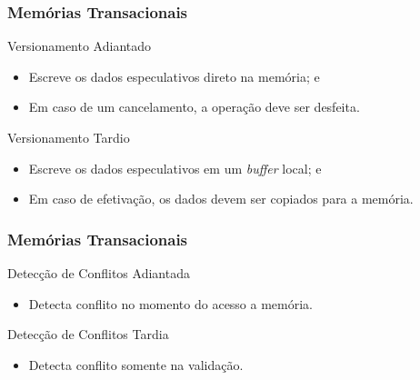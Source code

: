 \documentclass[10pt, pdf,xcolor=pdftex,dvipsnames,table]{beamer}
\begin{document}
\begin{frame} \frametitle{Memórias Transacionais}
\begin{block}{Versionamento Adiantado}
\begin{itemize}
	\item Escreve os dados especulativos direto na memória; e
	\item Em caso de um cancelamento, a operação deve ser desfeita.
\end{itemize}
\end{block}
\begin{block}{Versionamento Tardio}
\begin{itemize}
	\item Escreve os dados especulativos em um \textit{buffer} local; e
	\item Em caso de efetivação, os dados devem ser copiados para a memória.
\end{itemize}
\end{block}
\end{frame}

\begin{frame} \frametitle{Memórias Transacionais}
\begin{block}{Detecção de Conflitos Adiantada}
\begin{itemize}
	\item Detecta conflito no momento do acesso a memória.
\end{itemize}
\end{block}
\begin{block}{Detecção de Conflitos Tardia}
\begin{itemize}
	\item Detecta conflito somente na validação.
\end{itemize}
\end{block}
\end{frame}
\end{document}
